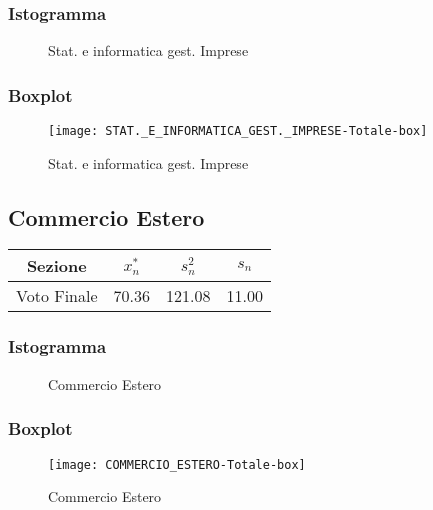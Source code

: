 \subsubsection{Istogramma}
\begin{figure}[!h]
  \caption{Stat. e informatica gest. Imprese}
\end{figure}

\subsubsection{Boxplot}
\begin{figure}[!h]
  \centering
  \texttt{[image: STAT.\_E\_INFORMATICA\_GEST.\_IMPRESE-Totale-box]}
  \caption{Stat. e informatica gest. Imprese}
\end{figure}
\restoregeometry
\clearpage

\thispagestyle{empty} %
\subsection{Commercio Estero}

\begin{center}
\begin{tabular}{|c|c|c|c|}
  \hline
  Sezione & \(x_{n}^{*}\) & \(s_n^2\) & \(s_n\) \\
  \hline
  Voto Finale & 70.36 & 121.08 & 11.00 \\
  \hline
\end{tabular}
\end{center}

\subsubsection{Istogramma}
\begin{figure}[!h]
  \caption{Commercio Estero}
\end{figure}

\subsubsection{Boxplot}
\begin{figure}[!h]
  \centering
  \texttt{[image: COMMERCIO\_ESTERO-Totale-box]}
  \caption{Commercio Estero}
\end{figure}
\restoregeometry
\clearpage

